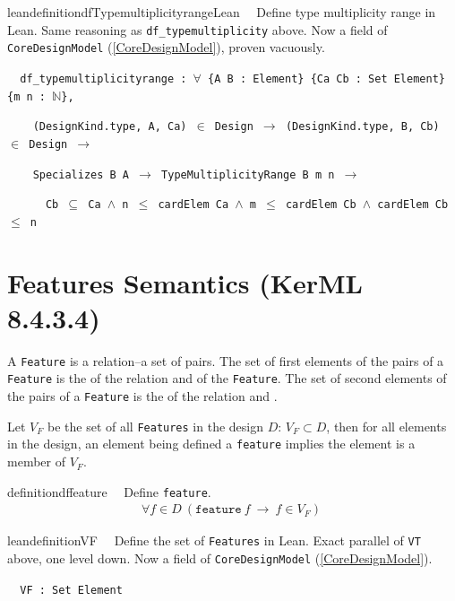 \begin{restatable}{leandefinition}{dfTypemultiplicityrangeLean}~~ Define type
multiplicity range in Lean. Same reasoning as \texttt{df\_typemultiplicity} above. Now a field of
\texttt{CoreDesignModel} (\ref{CoreDesignModel}), proven vacuously.

\texttt{~~df\_typemultiplicityrange : $\forall$ \{A B : Element\} \{Ca Cb : Set Element\} \{m n : $\mathbb{N}$\},}

\texttt{~~~~(DesignKind.type, A, Ca) $\in$ Design $\to$ (DesignKind.type, B, Cb) $\in$ Design $\to$}

\texttt{~~~~Specializes B A $\to$ TypeMultiplicityRange B m n $\to$}

\texttt{~~~~~~Cb $\subseteq$ Ca $\wedge$ n $\le$ cardElem Ca $\wedge$ m $\le$ cardElem Cb $\wedge$ cardElem Cb $\le$ n}
\label{df_typemultiplicityrange}
\end{restatable}


\section{Features Semantics (KerML 8.4.3.4)}

\pn A \texttt{Feature} is a relation--a set of pairs.  The set of first elements of the pairs of a \texttt{Feature} is the  of the relation and  of the \texttt{Feature}.  The set of second elements of the pairs of a \texttt{Feature} is the  of the relation and .

\pn Let $V_F$ be the set of all \texttt{Features} in the design $D$:  $V_F \subset D$, then for all elements in the design, an element being defined a \texttt{feature} implies the element is a member of $V_F$.

\begin{restatable}{definition}{dffeature}~~  Define \texttt{feature}.
\begin{align}
\forall f \in D~(\texttt{feature}~f~ \rightarrow ~f \in V_F)~\label{eq:df-feature}\tag{df-feature}
\end{align}
\end{restatable}

\begin{restatable}{leandefinition}{VF}~~ Define the set of \texttt{Features} in Lean. Exact parallel of
\texttt{VT} above, one level down. Now a field of \texttt{CoreDesignModel} (\ref{CoreDesignModel}).

\texttt{~~VF : Set Element}
\label{VF}
\end{restatable}

